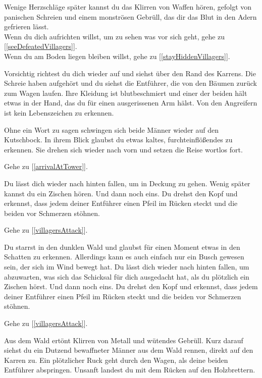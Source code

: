 Wenige Herzschläge später kannst du das Klirren von Waffen hören, gefolgt von panischen Schreien und einem monströsen Gebrüll, das dir das Blut in den Adern gefrieren lässt.
\\Wenn du dich aufrichten willst, um zu sehen was vor sich geht, gehe zu [\ref{seeDefeatedVillagers}].
\\Wenn du am Boden liegen bleiben willst, gehe zu [\ref{stayHiddenVillagers}].


Vorsichtig richtest du dich wieder auf und siehst über den Rand des Karrens. Die Schreie haben aufgehört und du siehst die Entführer, die von den Bäumen zurück zum Wagen laufen. Ihre Kleidung ist blutbeschmiert und einer der beiden hält etwas in der Hand, das du für einen ausgerissenen Arm hälst. Von den Angreifern ist kein Lebenszeichen zu erkennen.

Ohne ein Wort zu sagen schwingen sich beide Männer wieder auf den Kutschbock. In ihrem Blick glaubst du etwas kaltes, furchteinflößendes zu erkennen. Sie drehen sich wieder nach vorn und setzen die Reise wortlos fort.

Gehe zu [\ref{arrivalAtTower}].


Du lässt dich wieder nach hinten fallen, um in Deckung zu gehen. Wenig später kannst du ein Zischen hören. Und dann noch eins. Du drehst den Kopf und erkennst, dass jedem deiner Entführer einen Pfeil im Rücken steckt und die beiden vor Schmerzen stöhnen.

Gehe zu [\ref{villagersAttack}].


Du starrst in den dunklen Wald und glaubst für einen Moment etwas in den Schatten zu erkennen. Allerdings kann es auch einfach nur ein Busch gewesen sein, der sich im Wind bewegt hat. Du lässt dich wieder nach hinten fallen, um abzuwarten, was sich das Schicksal für dich ausgedacht hat, als du plötzlich ein Zischen hörst. Und dann noch eins. Du drehst den Kopf und erkennst, dass jedem deiner Entführer einen Pfeil im Rücken steckt und die beiden vor Schmerzen stöhnen.

Gehe zu [\ref{villagersAttack}].


Aus dem Wald ertönt Klirren von Metall und wütendes Gebrüll. Kurz darauf siehst du ein Dutzend bewaffneter Männer aus dem Wald rennen, direkt auf den Karren zu. Ein plötzlicher Ruck geht durch den Wagen, als deine beiden Entführer abspringen. Unsanft landest du mit dem Rücken auf den Holzbrettern.

